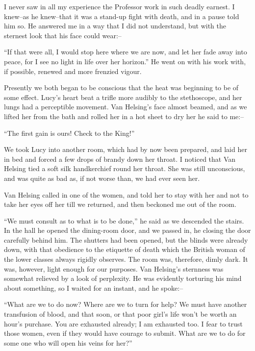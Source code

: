\documentclass[12pt,openright]{book}
\begin{document}
I never saw in all my experience the Professor work in such deadly earnest. I knew–as he knew–that it was a stand-up fight with death, and in a pause told him so. He answered me in a way that I did not understand, but with the sternest look that his face could wear:–

“If that were all, I would stop here where we are now, and let her fade away into peace, for I see no light in life over her horizon.” He went on with his work with, if possible, renewed and more frenzied vigour.

Presently we both began to be conscious that the heat was beginning to be of some effect. Lucy’s heart beat a trifle more audibly to the stethoscope, and her lungs had a perceptible movement. Van Helsing’s face almost beamed, and as we lifted her from the bath and rolled her in a hot sheet to dry her he said to me:–

“The first gain is ours! Check to the King!”

We took Lucy into another room, which had by now been prepared, and laid her in bed and forced a few drops of brandy down her throat. I noticed that Van Helsing tied a soft silk handkerchief round her throat. She was still unconscious, and was quite as bad as, if not worse than, we had ever seen her.

Van Helsing called in one of the women, and told her to stay with her and not to take her eyes off her till we returned, and then beckoned me out of the room.

“We must consult as to what is to be done,” he said as we descended the stairs. In the hall he opened the dining-room door, and we passed in, he closing the door carefully behind him. The shutters had been opened, but the blinds were already down, with that obedience to the etiquette of death which the British woman of the lower classes always rigidly observes. The room was, therefore, dimly dark. It was, however, light enough for our purposes. Van Helsing’s sternness was somewhat relieved by a look of perplexity. He was evidently torturing his mind about something, so I waited for an instant, and he spoke:–

“What are we to do now? Where are we to turn for help? We must have another transfusion of blood, and that soon, or that poor girl’s life won’t be worth an hour’s purchase. You are exhausted already; I am exhausted too. I fear to trust those women, even if they would have courage to submit. What are we to do for some one who will open his veins for her?”
\end{document}
